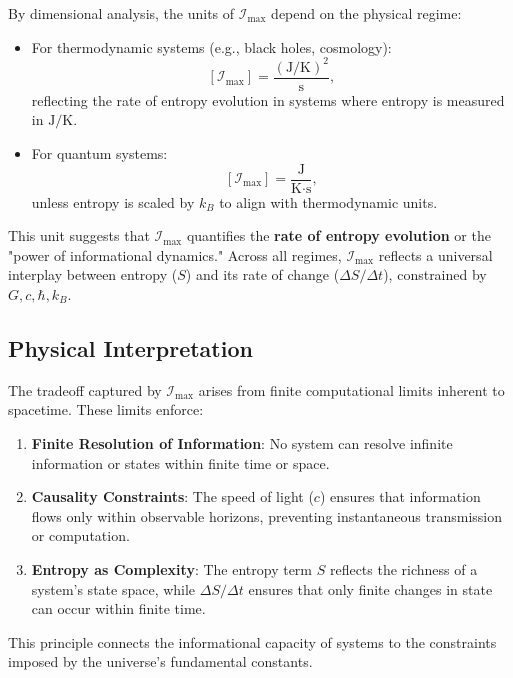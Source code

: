 \documentclass[12pt]{article}
\begin{document}
By dimensional analysis, the units of \( \mathcal{I}_{\text{max}} \) depend on the physical regime:
\begin{itemize}
    \item For thermodynamic systems (e.g., black holes, cosmology):
    \[
    \left[\mathcal{I}_{\text{max}}\right] = \frac{(\text{J}/\text{K})^2}{\text{s}},
    \]
    reflecting the rate of entropy evolution in systems where entropy is measured in \( \text{J}/\text{K} \).
    \item For quantum systems:
    \[
    \left[\mathcal{I}_{\text{max}}\right] = \frac{\text{J}}{\text{K} \cdot \text{s}},
    \]
    unless entropy is scaled by \( k_B \) to align with thermodynamic units.
\end{itemize}

This unit suggests that \( \mathcal{I}_{\text{max}} \) quantifies the \textbf{rate of entropy evolution} or the "power of informational dynamics." Across all regimes, \( \mathcal{I}_{\text{max}} \) reflects a universal interplay between entropy (\( S \)) and its rate of change (\( \Delta S / \Delta t \)), constrained by \( G, c, \hbar, k_B \).


\subsection{Physical Interpretation}
The tradeoff captured by \( \mathcal{I}_{\text{max}} \) arises from finite computational limits inherent to spacetime. These limits enforce:
\begin{enumerate}
    \item \textbf{Finite Resolution of Information}: No system can resolve infinite information or states within finite time or space.
    \item \textbf{Causality Constraints}: The speed of light (\( c \)) ensures that information flows only within observable horizons, preventing instantaneous transmission or computation.
    \item \textbf{Entropy as Complexity}: The entropy term \( S \) reflects the richness of a system’s state space, while \( \Delta S / \Delta t \) ensures that only finite changes in state can occur within finite time.
\end{enumerate}

This principle connects the informational capacity of systems to the constraints imposed by the universe’s fundamental constants.
\end{document}
